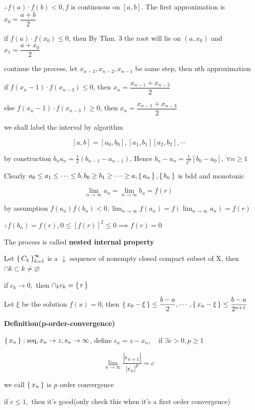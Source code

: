 $\therefore f(a) \cdot f(b) < 0,f$ is continuous on $[a,b]$.
The first approximation is $x_0 = \dfrac{a+b}{2}$

if $f(a) \cdot f(x_0) \leq 0$, then By Thm. 3 the root will lie on $(a,x_0)$ and $x_1 = \dfrac{a + x_0}{2}$

continue the process, let $x_{n-3},x_{n-2},x_{n-1}$ be same step, then nth approximation

if $f(x_n-1) \cdot f(x_{n-3}) \leq 0$, then $x_n = \dfrac{x_{n-1}+x_{n-2}}{2}$

else $f(x_n-1) \cdot f(x_{n-3}) \geq 0$, then $x_n = \dfrac{x_{n-1}+x_{n-3}}{2}$

we shall label the interval by algorithm

$$[a,b] = [a_0,b_0],[a_1,b_1][a_2,b_2],\cdots$$

by construction $b_na_n = \frac{1}{2}(b_{n-1} - a_{n-1})$, Hence $b_n - a_n = \frac{1}{2^{n}}[b_0-a_0],~\forall n \geq 1$

Clearly $a_0 \leq a_1 \leq \cdots \leq b, b_0 \geq b_1 \geq \cdots \geq a, \left\{ \,a_n \,\right\},\left\{ \,b_n \,\right\}$ is bdd and monotonic

$$\lim_{n \rightarrow \infty}a_n  = \lim_{n \rightarrow \infty}b_n = f(r)$$

by assumption $f(a_n)f(b_n) < 0, \lim_{n \rightarrow \infty}f(a_n) = f(\lim_{n \rightarrow \infty}a_n) = f(r)$

$\therefore f(b_n) = f(r), 0 \leq [f(r)]^2 \leq 0 \implies f(r) = 0$


The process is called \textbf{nested internal property}

\newpage

Let $\left\{ \,C_k \,\right\}^{\infty}_{k=1}$ is a $\downarrow$ sequence of nonempty closed compact subset of X, then $\cap k \subset k\neq \varnothing $

if $c_k \rightarrow 0,$ then $\cap_kc_k = \left\{ \,r \,\right\}$

Let $\xi$ be the solution $f(x) = 0$, then $\left\{ \,x_0-\xi \,\right\} \leq \dfrac{b-a}{2},\cdots,\left\{ \,x_n-\xi \,\right\}\leq \dfrac{b-a}{2^{n+1}}$

\textbf{Definition(p-order-convergence)}\\
\begin{tcolorbox}
	$\left\{ \,x_n \,\right\}:\text{seq}, x_n \rightarrow z, s_n \rightarrow \infty$, define $\epsilon_n = z - x_n$, ~ if $\exists c > 0, p\geq 1$
	
	$$\lim_{n \rightarrow \infty}\dfrac{|\epsilon_{n+1}|}{|\epsilon_n|^p} = c$$
	
	we call $\left\{ \,x_n \,\right\}$ is $p$ order convergence
	
	if $c \leq 1,$ then it's good(only check this when  it's a first order convergence)
\end{tcolorbox}

